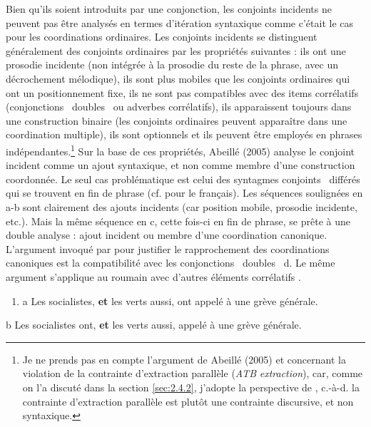 Bien qu'ils soient introduits par une conjonction, les conjoints incidents ne peuvent pas être analysés en termes d'itération syntaxique comme c'était le cas pour les coordinations ordinaires. Les conjoints incidents se distinguent généralement des conjoints ordinaires par les propriétés suivantes : ils ont une prosodie incidente (non intégrée à la prosodie du reste de la phrase, avec un décrochement mélodique), ils sont plus mobiles que les conjoints ordinaires qui ont un positionnement fixe, ils ne sont pas compatibles avec des items corrélatifs (conjonctions {\guillemotleft}~doubles~{\guillemotright} ou adverbes corrélatifs), ils apparaissent toujours dans une construction binaire (les conjoints ordinaires peuvent apparaître dans une coordination multiple), ils sont optionnels et ils peuvent être employés en phrases indépendantes.\footnote{Je ne prends pas en compte l'argument de Abeillé (2005) et \citet{Mouret2007} concernant la violation de la contrainte d'extraction parallèle (\textit{ATB} \textit{extraction}), car, comme on l'a discuté dans la section \ref{sec:2.4.2}, j'adopte la perspective de \citet{Kehler2002}, c.-à-d. la contrainte d'extraction parallèle est plutôt une contrainte discursive, et non syntaxique.} Sur la base de ces propriétés, Abeillé (2005) analyse le conjoint incident comme un ajout syntaxique, et non comme membre d'une construction coordonnée. Le seul cas problématique est celui des syntagmes conjoints {\guillemotleft}~différés~{\guillemotright} qui se trouvent en fin de phrase (cf. \citet{Mouret2007} pour le français). Les séquences soulignées en a-b sont clairement des ajouts incidents (car position mobile, prosodie incidente, etc.). Mais la même séquence en c, cette fois-ci en fin de phrase, se prête à une double analyse : ajout incident ou membre d'une coordination canonique. L'argument invoqué par \citet{Mouret2007} pour justifier le rapprochement des coordinations canoniques est la compatibilité avec les conjonctions {\guillemotleft}~doubles~{\guillemotright} d. Le même argument s'applique au roumain avec d'autres éléments corrélatifs .


\begin{enumerate}
\item \label{bkm:Ref274176341}a  Les socialistes, \textbf{et} les verts aussi, ont appelé à une grève générale.


\end{enumerate}
  b  Les socialistes ont, \textbf{et} les verts aussi, appelé à une grève générale.

